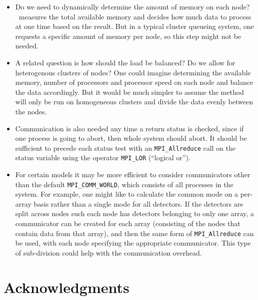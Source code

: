 \documentclass[oneside,11pt]{starlink}
\begin{document}
\begin{itemize}

\item Do we need to dynamically determine the amount of memory on each
  node? \makemap\ measures the total available memory and decides how
  much data to process at one time based on the result. But in a
  typical cluster queueing system, one requests a specific amount of
  memory per node, so this step might not be needed.

\item A related question is how should the load be balanced? Do we
  allow for heterogenous clusters of nodes? One could imagine
  determining the available memory, number of processors and processor
  speed on each node and balance the data accordingly. But it would
  be much simpler to assume the method will only be run on homogeneous
  clusters and divide the data evenly between the nodes.

\item Communication is also needed any time a return status is
  checked, since if one process is going to abort, then whole system
  should abort. It should be sufficient to precede each status test
  with an \verb+MPI_Allreduce+ call on the status variable using the
  operator \verb+MPI_LOR+ (``logical or'').

\item For certain models it may be more efficient to consider
  communicators other than the default \verb+MPI_COMM_WORLD+, which
  consists of all processes in the system. For example, one might like
  to calculate the common mode on a per-array basis rather than a
  single mode for all detectors. If the detectors are split across
  nodes such each node has detectors belonging to only one array, a
  communicator can be created for each array (consisting of the nodes
  that contain data from that array), and then the same form
  of \verb+MPI_Allreduce+ can be used, with each node specifying the
  appropriate communicator. This type of sub-division could help with
  the communication overhead.

\end{itemize}

\section{Acknowledgments\label{se:acknowledgments}}
\end{document}
